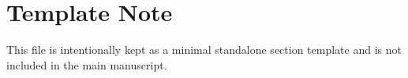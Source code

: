 \documentclass[class=article,crop=false]{standalone}
\begin{document}
\section{Template Note}
This file is intentionally kept as a minimal standalone section template and is not included in the main manuscript.
\end{document}
